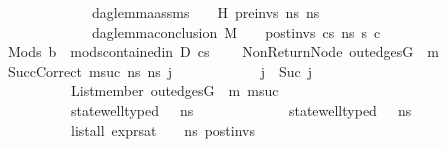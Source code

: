 \begin{isabellebody}
\ \ \ \ \ \ \ \ \ \ \ \ \ \ \ dag{\isacharunderscore}{\kern0pt}lemma{\isacharunderscore}{\kern0pt}assms\ {\isasymLambda}\ {\isasymGamma}\ {\isasymOmega}\ H\ pre{\isacharunderscore}{\kern0pt}invs\ ns{}\ ns{}\ \ {\isasymLongrightarrow}\ \ \ \ \ \ \isanewline
\ \ \ \ \ \ \ \ \ \ \ \ \ \ \ dag{\isacharunderscore}{\kern0pt}lemma{\isacharunderscore}{\kern0pt}conclusion\ M\ {\isasymLambda}\ {\isasymGamma}\ {\isasymOmega}\ post{\isacharunderscore}{\kern0pt}invs\ cs{}\ ns{}\ s{}{\isacharprime}{\kern0pt}{\isacharprime}{\kern0pt}\ c{\isachardoublequoteclose}\ \isanewline
\ \ \ Mods{\isacharcolon}{\kern0pt}\ {\isachardoublequoteopen}b\ {\isasymLongrightarrow}\ mods{\isacharunderscore}{\kern0pt}contained{\isacharunderscore}{\kern0pt}in\ D\ cs{}{\isachardoublequoteclose}\ \isanewline
\ \ \ NonReturnNode{\isacharcolon}{\kern0pt}\ {\isachardoublequoteopen}out{\isacharunderscore}{\kern0pt}edges{\isacharparenleft}{\kern0pt}G{}{\isacharparenright}{\kern0pt}\ {\isacharbang}{\kern0pt}\ m{}\ {\isasymnoteq}\ {\isacharbrackleft}{\kern0pt}{\isacharbrackright}{\kern0pt}{\isachardoublequoteclose}\ \isanewline
\ \ \ SuccCorrect{\isacharcolon}{\kern0pt}{\isachardoublequoteopen}{\isasymAnd}\ msuc\ ns{}{\isacharprime}{\kern0pt}{\isacharprime}{\kern0pt}\ ns{}{\isacharprime}{\kern0pt}{\isacharprime}{\kern0pt}\ j{\isacharprime}{\kern0pt}{\isachardot}{\kern0pt}\isanewline
\ \ \ \ \ \ \ \ \ \ \ \ j\ {\isacharequal}{\kern0pt}\ Suc\ j{\isacharprime}{\kern0pt}\ {\isasymLongrightarrow}\isanewline
\ \ \ \ \ \ \ \ \ \ \ \ List{\isachardot}{\kern0pt}member\ {\isacharparenleft}{\kern0pt}out{\isacharunderscore}{\kern0pt}edges{\isacharparenleft}{\kern0pt}G{}{\isacharparenright}{\kern0pt}\ {\isacharbang}{\kern0pt}\ m{}{\isacharparenright}{\kern0pt}\ msuc\ {\isasymLongrightarrow}\isanewline
\ \ \ \ \ \ \ \ \ \ \ \ state{\isacharunderscore}{\kern0pt}well{\isacharunderscore}{\kern0pt}typed\ {\isasymLambda}\ {\isasymOmega}\ ns{}{\isacharprime}{\kern0pt}{\isacharprime}{\kern0pt}\ {\isasymLongrightarrow}\isanewline
\ \ \ \ \ \ \ \ \ \ \ \ state{\isacharunderscore}{\kern0pt}well{\isacharunderscore}{\kern0pt}typed\ {\isasymLambda}\ {\isasymOmega}\ ns{}{\isacharprime}{\kern0pt}{\isacharprime}{\kern0pt}\ {\isasymLongrightarrow}\isanewline
\ \ \ \ \ \ \ \ \ \ \ \ list{\isacharunderscore}{\kern0pt}all\ {\isacharparenleft}{\kern0pt}expr{\isacharunderscore}{\kern0pt}sat\ {\isasymLambda}\ {\isasymGamma}\ {\isasymOmega}\ ns{}{\isacharprime}{\kern0pt}{\isacharprime}{\kern0pt}{\isacharparenright}{\kern0pt}\ post{\isacharunderscore}{\kern0pt}invs\ {\isasymLongrightarrow}\isanewline

\end{isabellebody}
